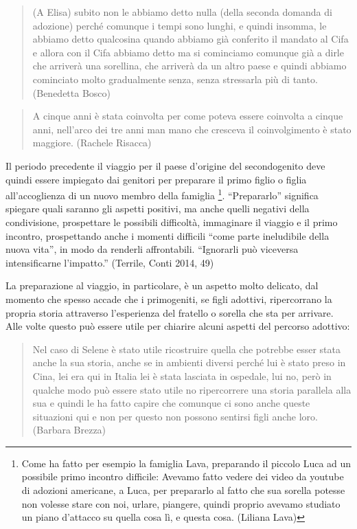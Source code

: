 \documentclass[12pt,oneside,svgnames]{memoir}
\newenvironment{quotationb}%
{\color{maincolor}\begin{leftbar}\begin{quotation}}%
{\end{quotation}\end{leftbar}\ignorespacesafterend}
\begin{document}
\begin{quotationb}
(A Elisa) subito non le abbiamo detto nulla (della seconda domanda di
adozione) perché comunque i tempi sono lunghi, e quindi insomma, le
abbiamo detto qualcosina quando abbiamo già conferito il mandato al Cifa
e allora con il Cifa abbiamo detto ma si cominciamo comunque già a dirle
che arriverà una sorellina, che arriverà da un altro paese e quindi
abbiamo cominciato molto gradualmente senza, senza stressarla più di
tanto. (Benedetta Bosco)
\end{quotationb}

\begin{quotationb}
A cinque anni è stata coinvolta per come poteva essere coinvolta a
cinque anni, nell'arco dei tre anni man mano che cresceva il
coinvolgimento è stato maggiore. (Rachele Risacca)
\end{quotationb}

Il periodo precedente il viaggio per il paese d'origine del
secondogenito deve quindi essere impiegato dai genitori per preparare il
primo figlio o figlia all'accoglienza di un nuovo membro della famiglia
\footnote{Come ha fatto per esempio la famiglia Lava, preparando il
  piccolo Luca ad un possibile primo incontro difficile: Avevamo fatto
  vedere dei video da youtube di adozioni americane, a Luca, per
  prepararlo al fatto che sua sorella potesse non volesse stare con noi,
  urlare, piangere, quindi proprio avevamo studiato un piano d'attacco
  su quella cosa lì, e questa cosa. (Liliana Lava)}. ``Prepararlo''
significa spiegare quali saranno gli aspetti positivi, ma anche quelli
negativi della condivisione, prospettare le possibili difficoltà,
immaginare il viaggio e il primo incontro, prospettando anche i momenti
difficili ``come parte ineludibile della nuova vita'', in modo da
renderli affrontabili. ``Ignorarli può viceversa intensificarne
l'impatto.'' (Terrile, Conti 2014, 49)

La preparazione al viaggio, in particolare, è un aspetto molto delicato,
dal momento che spesso accade che i primogeniti, se figli adottivi,
ripercorrano la propria storia attraverso l'esperienza del fratello o
sorella che sta per arrivare. Alle volte questo può essere utile per
chiarire alcuni aspetti del percorso adottivo:

\begin{quotationb}
Nel caso di Selene è stato utile ricostruire quella che potrebbe esser
stata anche la sua storia, anche se in ambienti diversi perché lui è
stato preso in Cina, lei era qui in Italia lei è stata lasciata in
ospedale, lui no, però in qualche modo può essere stato utile no
ripercorrere una storia parallela alla sua e quindi le ha fatto capire
che comunque ci sono anche queste situazioni qui e non per questo non
possono sentirsi figli anche loro. (Barbara Brezza)
\end{quotationb}
\end{document}
